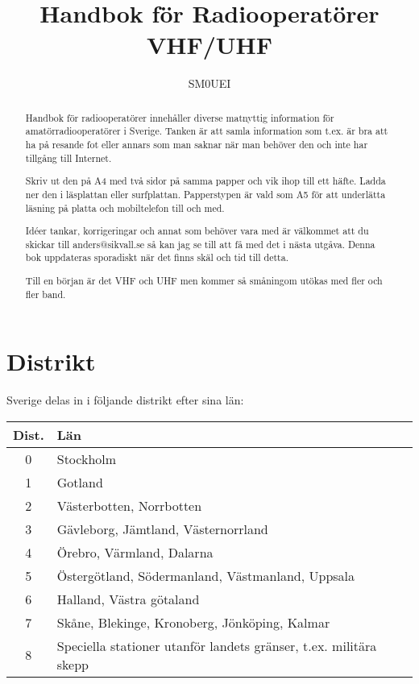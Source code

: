 \documentclass[12pt,swedish,a4paper]{article}
\begin{document}
\title{Handbok för Radiooperatörer\\
VHF/UHF}
\author{SM0UEI}
\maketitle

\begin{abstract}
Handbok för radiooperatörer innehåller diverse matnyttig information för amatörradiooperatörer i Sverige. Tanken är att samla information som t.ex. är bra att ha på resande fot eller annars som man saknar när man behöver den och inte har tillgång till Internet.

Skriv ut den på A4 med två sidor på samma papper och vik ihop till ett häfte. Ladda ner den i läsplattan eller surfplattan. Papperstypen är vald som A5 för att underlätta läsning på platta och mobiltelefon till och med.

Idéer tankar, korrigeringar och annat som behöver vara med är välkommet att du skickar till anders@sikvall.se så kan jag se till att få med det i nästa utgåva. Denna bok uppdateras sporadiskt när det finns skäl och tid till detta.

Till en början är det VHF och UHF men kommer så småningom utökas med fler och fler band.
\end{abstract}

\clearpage
\tableofcontents
\clearpage

\setlength{\parskip}{0.5em}
\setlength{\parindent}{0pt}


\section{Distrikt}

Sverige delas in i följande distrikt efter sina län:

\footnotesize
\begin{tabular}{cl}
\textbf{Dist.} & \textbf{Län}\\
\hline
0 & Stockholm\\
1 & Gotland\\
2 & Västerbotten, Norrbotten\\
3 & Gävleborg, Jämtland, Västernorrland\\
4 & Örebro, Värmland, Dalarna\\
5 & Östergötland, Södermanland, Västmanland, Uppsala\\
6 & Halland, Västra götaland\\
7 & Skåne, Blekinge, Kronoberg, Jönköping, Kalmar\\
8 & Speciella stationer utanför landets gränser, t.ex. militära skepp\\
\end{tabular}
\normalsize
\end{document}
